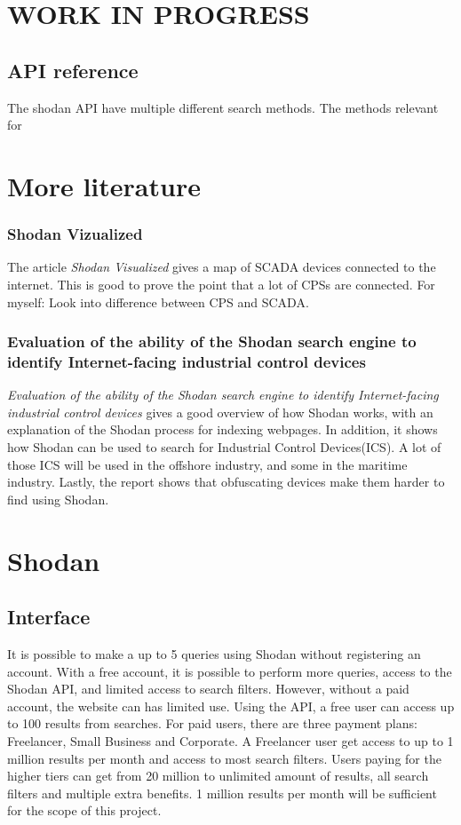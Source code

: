 \section{WORK IN PROGRESS} \label{sec:new}

\subsection{API reference}
The shodan API have multiple different search methods. The methods relevant for 

\section{More literature}
\subsubsection{Shodan Vizualized}
The article \textit{Shodan Visualized} gives a map of SCADA devices connected to the internet.\cite{ercolani_patton_chen_2016} This is good to prove the point that a lot of CPSs are connected. For myself: Look into difference between CPS and SCADA. 

\subsubsection{Evaluation of the ability of the Shodan search engine to identify Internet-facing industrial control devices}
\textit{Evaluation of the ability of the Shodan search engine to identify Internet-facing industrial control devices} gives a good overview of how Shodan works, with an explanation of the Shodan process for indexing webpages.\cite{bodenheim_butts_dunlap_mullins_2014} 
In addition, it shows how Shodan can be used to search for Industrial Control Devices(ICS). A lot of those ICS will be used in the offshore industry, and some in the maritime industry. 
Lastly, the report shows that obfuscating devices make them harder to find using Shodan.

\section{Shodan}
\subsection{Interface}
It is possible to make a up to 5 queries using Shodan without registering an account. 
With a free account, it is possible to perform more queries, access to the Shodan API, and limited access to search filters. However, without a paid account, the website can has limited use.
Using the API, a free user can access up to 100 results from searches. 
For paid users, there are three payment plans: Freelancer, Small Business and Corporate. A Freelancer user get access to up to 1 million results per month and access to most search filters. 
Users paying for the higher tiers can get from 20 million to unlimited amount of results, all search filters and multiple extra benefits. 
1 million results per month will be sufficient for the scope of this project.

